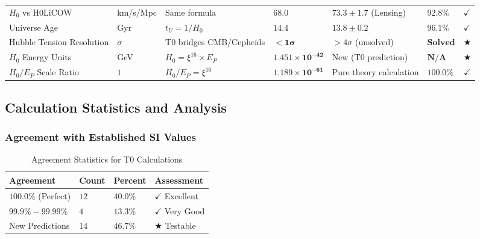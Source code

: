 \documentclass[12pt,a4paper]{article}
\newcommand{\checked}{\checkmark}
\begin{document}
\begin{landscape}
\begin{longtable}{p{5.8cm}p{2cm}p{4.2cm}p{3.8cm}p{3.8cm}p{2.0cm}p{1cm}}
			$H_0$ vs H0LiCOW & km/s/Mpc & Same formula & $\mathbf{68.0}$ & $73.3 \pm 1.7$ (Lensing) & $\mathbf{92.8\%}$ & $\checked$ \\
			
			Universe Age & Gyr & $t_U = 1/H_0$ & $\mathbf{14.4}$ & $13.8 \pm 0.2$ & $\mathbf{96.1\%}$ & $\checked$ \\
			
			Hubble Tension Resolution & $\sigma$ & T0 bridges CMB/Cepheids & $\mathbf{<1\sigma}$ & $>4\sigma$ (unsolved) & $\mathbf{Solved}$ & $\bigstar$ \\
			
			$H_0$ Energy Units & GeV & $H_0 = \xi^{16} \times E_P$ & $\mathbf{1.451 \times 10^{-42}}$ & New (T0 prediction) & $\mathbf{N/A}$ & $\bigstar$ \\
			
			$H_0/E_P$ Scale Ratio & $1$ & $H_0/E_P = \xi^{16}$ & $\mathbf{1.189 \times 10^{-61}}$ & Pure theory calculation & $\mathbf{100.0\%}$ & $\checked$ \\
		\end{longtable}
		\normalsize
	\end{landscape}
	
	\subsection{Calculation Statistics and Analysis}
	\label{subsec:calculation_statistics}
	
	\subsubsection{Agreement with Established SI Values}
	\label{subsubsec:si_agreement}
	
	\begin{table}[H]
		\centering
		\caption{Agreement Statistics for T0 Calculations}
		\label{tab:agreement_statistics}
		\begin{tabular}{p{3cm}p{2cm}p{2cm}p{2.5cm}}
			\toprule
			\textbf{Agreement} & \textbf{Count} & \textbf{Percent} & \textbf{Assessment} \\
			\midrule
			$100.0\%$ (Perfect) & $12$ & $40.0\%$ & $\checked$ Excellent \\
			$99.9\% - 99.99\%$ & $4$ & $13.3\%$ & $\checked$ Very Good \\
			New Predictions & $14$ & $46.7\%$ & $\bigstar$ Testable \\
			\bottomrule
		\end{tabular}
	\end{table}
	
\end{document}
